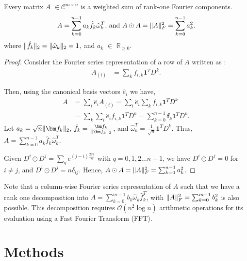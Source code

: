 \documentclass[onefignum,onetabnum]{siamart171218}
\DeclarePairedDelimiter\norm{\lVert}{\rVert}
\begin{document}
\begin{theorem}
Every matrix $A$ $\in \mathcal{C}^{m \times n}$ is a weighted sum of rank-one Fourier components.
\begin{align*}
    A = \sum_{k=0}^{n-1} a_k \hat{f}_k \hat{\omega}_k^T \text{, and } A \odot A = \norm{A}_F^2 = \sum_{k=0}^{n-1} a_k^2.
\end{align*}
where $\norm{\hat{f}_k}_2 = \norm{\hat{\omega}_k}_2=1$, and $a_k$ $\in$ $\mathbb{R}_{\geq 0}$.
\end{theorem}

\begin{proof}
Consider the Fourier series representation of a row of $A$ written as :
    \begin{align*}
        A_{(i)} &= \sum_{k} f_{i,k} \mathbf{1}^T D^k.  
    \end{align*}
    
    Then, using the canonical basis vectors $\hat{e}_i$ we have, 
    \begin{align*}
        A &= \sum_{i} \hat{e}_i A_{(i)} = \sum_{i} \hat{e}_i \sum_{k} f_{i,k} \mathbf{1}^T D^k\\
        &= \sum_{k} \sum_{i} \hat{e}_i f_{i,k} \mathbf{1}^T D^k
        =  \sum_{k=0}^{n-1} \bm f_k \mathbf{1}^T D^k.
    \end{align*}
    Let $a_k = \sqrt{n}\norm{\bm f_k}_2$, $\hat{f}_k=\frac{\bm f_k}{\norm{\bm f_k}_2}$, and $\hat{\omega}_k^T=\frac{1}{\sqrt{n}} \mathbf{1}^T D^k$. Thus, $A = \sum_{k=0}^{n-1} a_k \hat{f}_k \hat{\omega}_k^T.$

Given $D^i \odot D^j = \sum_q e^{(j-i)\frac{2q \pi}{n}}$ with $q=0, 1, 2 \dots n-1$, we have $D^i \odot D^j =0$ for $i \neq j$, and $D^i \odot D^j = n\delta_{ij}$. Hence, $A \odot A = \norm{A}_F^2 = \sum_{k=0}^{n-1} a_k^2$.

\end{proof}

Note that a column-wise Fourier series representation of $A$ such that we have a rank one decomposition into $A = \sum_{k=0}^{m-1} b_k \hat{\omega}_k \hat{f}_k^T$, with $\norm{A}_F^2 = \sum_{k=0}^{m-1} b_k^2$ is also possible. This decomposition requires $\mathcal{O}(n^2 \log n)$ arithmetic operations for its evaluation using a Fast Fourier Transform (FFT).

\section{Methods} \label{sec:methods}
\end{document}
